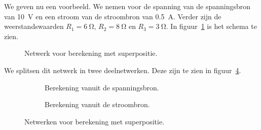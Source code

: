 \begin{example}
We geven nu een voorbeeld. We nemen voor de spanning van de spanningsbron
van \SI{10}{\volt} en een stroom van de stroombron van \SI{0.5}{\ampere}. Verder zijn de weerstandswaarden
$R_1 = \SI{6}{\ohm}$, $R_2 = \SI{8}{\ohm}$ en $R_3 = \SI{3}{\ohm}$. In
figuur~\ref{fig:gelnetwerkvoorsuperpositiebeginsel2} is het schema te zien.

\begin{figure}[H]
\centering
{}
\caption{Netwerk voor berekening met superpositie.}
\label{fig:gelnetwerkvoorsuperpositiebeginsel2}
\end{figure}

We splitsen dit netwerk in twee deelnetwerken. Deze zijn te zien in
figuur~\ref{fig:gelnetwerkvoorsuperpositiebeginselsplitab2}.

\begin{figure}[H]
\begin{subfigure}{0.48\textwidth}
\centering
{}
\caption{Berekening vanuit de spanningsbron.}
\label{fig:gelnetwerkvoorsuperpositiebeginselsplita2}
\end{subfigure}\hfill%
\begin{subfigure}{0.48\textwidth}
\centering
{}
\caption{Berekening vanuit de stroombron.}
\label{fig:gelnetwerkvoorsuperpositiebeginselsplitb2}
\end{subfigure}
\caption{Netwerken voor berekening met superpositie.}
\label{fig:gelnetwerkvoorsuperpositiebeginselsplitab2}
\end{figure}


\end{example}
